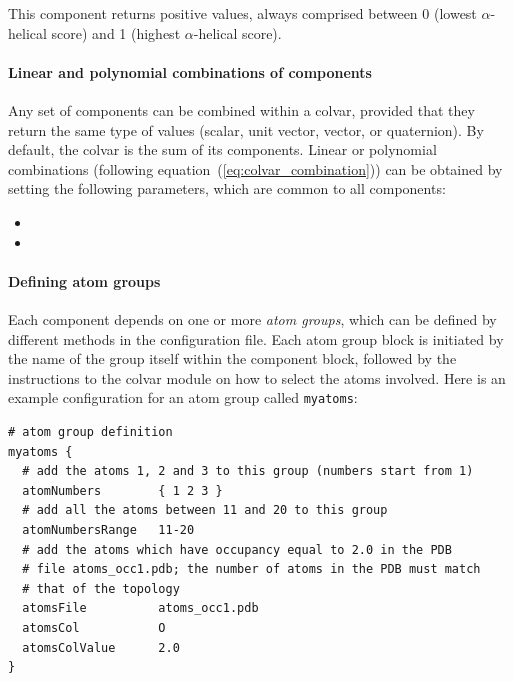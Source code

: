 This component returns positive values, always comprised between 0
(lowest $\alpha$-helical score) and 1 (highest $\alpha$-helical
score).



\paragraph*{Linear and polynomial combinations of components}
Any set of components can be combined within a colvar,
provided that they return
the same type of values (scalar, unit vector, vector, or quaternion).
By default, the colvar is the sum of its components.
Linear or polynomial combinations (following equation~(\ref{eq:colvar_combination}))
can be obtained by setting the following
parameters, which are common to all components:
\begin{itemize}

\item %

\item %

\end{itemize}


\paragraph*{Defining atom groups}
\label{sec:colvar_atom_groups}
Each component depends on one
or more \emph{atom groups}, which can be defined by different methods
in the configuration file.  Each atom group block is
initiated by the name of the group itself within the component block,
followed by the instructions to the colvar module on how to select the
atoms involved.  Here is an example configuration for an atom group called
\texttt{myatoms}:
\begin{verbatim}
# atom group definition
myatoms {
  # add the atoms 1, 2 and 3 to this group (numbers start from 1)
  atomNumbers        { 1 2 3 }
  # add all the atoms between 11 and 20 to this group
  atomNumbersRange   11-20
  # add the atoms which have occupancy equal to 2.0 in the PDB
  # file atoms_occ1.pdb; the number of atoms in the PDB must match
  # that of the topology
  atomsFile          atoms_occ1.pdb
  atomsCol           O
  atomsColValue      2.0
}
\end{verbatim}

